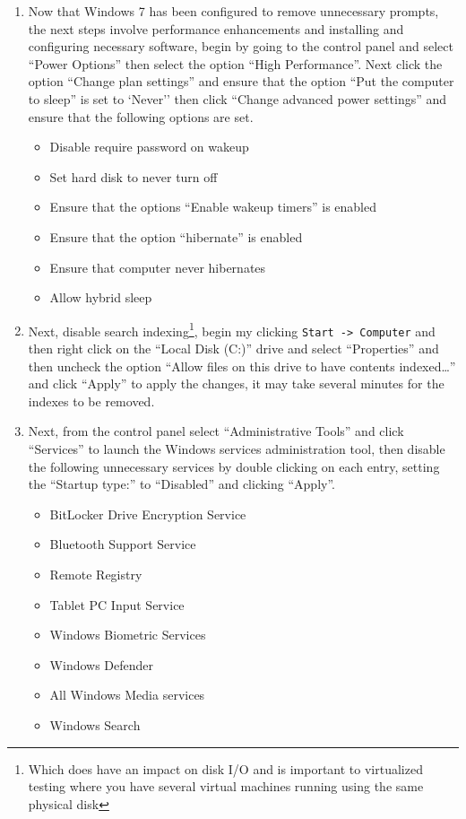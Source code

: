 \begin{enumerate}
\item	Now that Windows 7 has been configured to remove unnecessary prompts, the next steps involve performance enhancements and installing
		and configuring necessary software, begin by going to the control panel and select ``Power Options'' then select the option 
		``High Performance''. Next click the option ``Change plan settings'' and ensure that the option ``Put the computer to sleep'' is
		set to `Never'' then click ``Change advanced power settings'' and ensure that the following options are set.
\begin{itemize}
\item	Disable require password on wakeup
\item	Set hard disk to never turn off
\item	Ensure that the options ``Enable wakeup timers'' is enabled
\item	Ensure that the option ``hibernate'' is enabled
\item	Ensure that computer never hibernates
\item	Allow hybrid sleep
\end{itemize}

\item	Next, disable search indexing\footnote{Which does have an impact on disk I/O and is important to virtualized testing where you have
		several virtual machines running using the same physical disk}, begin my clicking \verb|Start -> Computer| and then right click 
		on the 	``Local Disk (C:)'' drive and select ``Properties'' and then uncheck the option ``Allow files on this drive to have contents
		indexed\ldots{}'' and click ``Apply'' to apply the changes, it may take several minutes for the indexes to be removed.
		
\item	Next, from the control panel select ``Administrative Tools'' and click ``Services'' to launch the Windows services administration tool,
		then disable the following unnecessary services by double clicking on each entry, setting the ``Startup type:'' to ``Disabled'' and
		clicking ``Apply''.
\begin{itemize}
\item	BitLocker Drive Encryption Service
\item	Bluetooth Support Service
\item	Remote Registry
\item	Tablet PC Input Service
\item	Windows Biometric Services
\item	Windows Defender
\item	All Windows Media services
\item	Windows Search
\end{itemize}


\end{enumerate}
